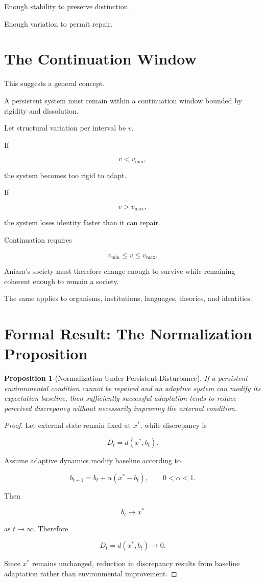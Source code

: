 \documentclass[11pt,oneside]{book}
\newtheorem{proposition}[theorem]{Proposition}
\theoremstyle{definition}
\theoremstyle{remark}
\begin{document}
Enough stability to preserve distinction.

Enough variation to permit repair.

\section{The Continuation Window}

This suggests a general concept.

A persistent system must remain within a continuation window bounded by rigidity and dissolution.

Let structural variation per interval be \(v\).

If

\[
v<v_{\min},
\]

the system becomes too rigid to adapt.

If

\[
v>v_{\max},
\]

the system loses identity faster than it can repair.

Continuation requires

\[
v_{\min}
\leq
v
\leq
v_{\max}.
\]

Aniara's society must therefore change enough to survive while remaining coherent enough to remain a society.

The same applies to organisms, institutions, languages, theories, and identities.

\section{Formal Result: The Normalization Proposition}

\begin{proposition}[Normalization Under Persistent Disturbance]
If a persistent environmental condition cannot be repaired and an adaptive system can modify its expectation baseline, then sufficiently successful adaptation tends to reduce perceived discrepancy without necessarily improving the external condition.
\end{proposition}

\begin{proof}
Let external state remain fixed at \(x^\ast\), while discrepancy is

\[
D_t=d(x^\ast,b_t).
\]

Assume adaptive dynamics modify baseline according to

\[
b_{t+1}
=
b_t+\alpha(x^\ast-b_t),
\qquad
0<\alpha<1.
\]

Then

\[
b_t\rightarrow x^\ast
\]

as \(t\rightarrow\infty\). Therefore

\[
D_t=d(x^\ast,b_t)\rightarrow0.
\]

Since \(x^\ast\) remains unchanged, reduction in discrepancy results from baseline adaptation rather than environmental improvement.
\end{proof}
\end{document}
